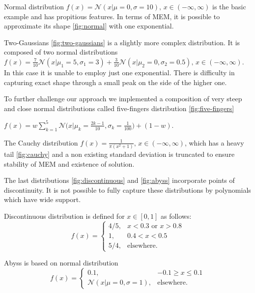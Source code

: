 \documentclass{article}
\begin{document}
Normal distribution $f(x) = \mathcal{N}(x|\mu=0, \sigma=10) \text{, } x \in (-\infty, \infty)$ is the basic example and has propitious features. In terms of MEM, it is possible to approximate its shape \ref{fig:normal} with one exponential. 

Two-Gaussians \ref{fig:two-gaussians} is a slightly more complex distribution. It is composed of two normal distributions $ f(x) = \frac{7}{10} \mathcal{N}(x|\mu_{1}=5, \sigma_{1}=3) + \frac{3}{10}\mathcal{N}(x|\mu_{2}=0, \sigma_{2}=0.5) \text{, } x \in (-\infty, \infty) \text{.}$ In this case it is unable to employ just one exponential. There is difficulty in capturing exact shape through a small peak on the side of the higher one.


To further challenge our approach we implemented a composition of very steep and close normal distributions called five-fingers distribution \ref{fig:five-fingers}

$ f(x) = w \sum_{k=1}^{5}{\mathcal{N}\bigg(x\bigg|\mu_{k}=\frac{2k-1}{10}, \sigma_{k} = \frac{1}{100}\bigg)} + (1-w) \text{.}$ 


The Cauchy distribution $f(x) = \frac{1}{\pi(x^2 + 1)} \text{, } x \in (-\infty, \infty)$, which has a heavy tail \ref{fig:cauchy} and a non existing standard deviation is truncated to ensure stability of MEM and existence of solution.

The last distributions \ref{fig:discontinuous} and \ref{fig:abyss} incorporate points of discontinuity. It is not possible to fully capture these distributions by polynomials which have wide support. 

Discontinuous distribution is defined for $x \in [0, 1]$ as follows:
\begin{equation}
    f(x)=
    \begin{cases}
      4/5, & x < 0.3 \text{ or } x > 0.8 \\
      1, & 0.4 < x < 0.5 \\
      5/4, & \text{elsewhere.}
    \end{cases}
 \end{equation}
  
Abyss is based on normal distribution
  \begin{equation}
    f(x)=
    \begin{cases}
      0.1, & -0.1 \geq x \leq 0.1 \\   
      \mathcal{N}(x|\mu=0, \sigma=1), & \text{elsewhere.}
    \end{cases}
 \end{equation}
  
\end{document}
